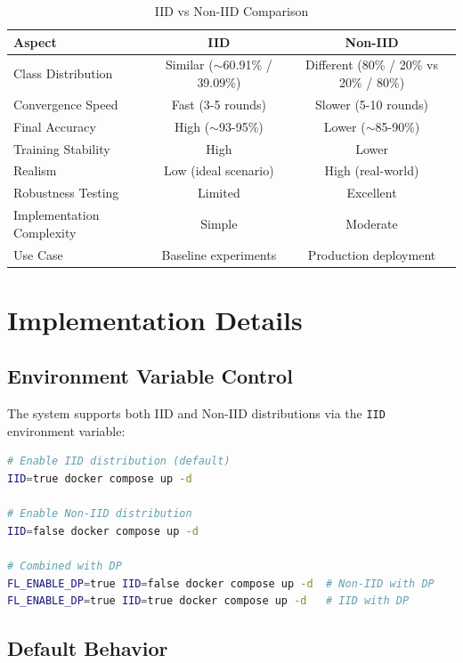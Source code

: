 \documentclass[12pt,a4paper]{article}
\begin{document}
\begin{table}[h]
\centering
\begin{tabular}{@{}lcc@{}}
\toprule
\textbf{Aspect} & \textbf{IID} & \textbf{Non-IID} \\
\midrule
Class Distribution & Similar ($\sim$60.91\% / 39.09\%) & Different (80\% / 20\% vs 20\% / 80\%) \\
Convergence Speed & Fast (3-5 rounds) & Slower (5-10 rounds) \\
Final Accuracy & High ($\sim$93-95\%) & Lower ($\sim$85-90\%) \\
Training Stability & High & Lower \\
Realism & Low (ideal scenario) & High (real-world) \\
Robustness Testing & Limited & Excellent \\
Implementation Complexity & Simple & Moderate \\
Use Case & Baseline experiments & Production deployment \\
\bottomrule
\end{tabular}
\caption{IID vs Non-IID Comparison}
\end{table}

\section{Implementation Details}

\subsection{Environment Variable Control}

The system supports both IID and Non-IID distributions via the \texttt{IID} environment variable:

\begin{lstlisting}[language=bash]
# Enable IID distribution (default)
IID=true docker compose up -d

# Enable Non-IID distribution
IID=false docker compose up -d

# Combined with DP
FL_ENABLE_DP=true IID=false docker compose up -d  # Non-IID with DP
FL_ENABLE_DP=true IID=true docker compose up -d   # IID with DP
\end{lstlisting}

\subsection{Default Behavior}
\end{document}
